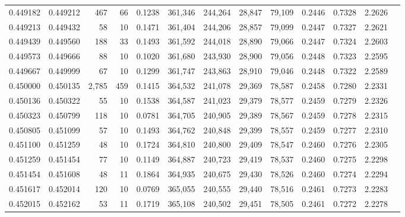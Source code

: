 \begin{tabular}{rrrrrrrrrrrrr}
0.449182 & 0.449212 &   467 &  66 &                                     0.1238 & 361,346 & 244,264 &  28,847 &  79,109 & 0.2446 & 0.7328 & 2.2626 \\
0.449213 & 0.449432 &    58 &  10 &                                     0.1471 & 361,404 & 244,206 &  28,857 &  79,099 & 0.2447 & 0.7327 & 2.2621 \\
0.449439 & 0.449560 &   188 &  33 &                                     0.1493 & 361,592 & 244,018 &  28,890 &  79,066 & 0.2447 & 0.7324 & 2.2603 \\
0.449573 & 0.449666 &    88 &  10 &                                     0.1020 & 361,680 & 243,930 &  28,900 &  79,056 & 0.2448 & 0.7323 & 2.2595 \\
0.449667 & 0.449999 &    67 &  10 &                                     0.1299 & 361,747 & 243,863 &  28,910 &  79,046 & 0.2448 & 0.7322 & 2.2589 \\
0.450000 & 0.450135 & 2,785 & 459 &                                     0.1415 & 364,532 & 241,078 &  29,369 &  78,587 & 0.2458 & 0.7280 & 2.2331 \\
0.450136 & 0.450322 &    55 &  10 &                                     0.1538 & 364,587 & 241,023 &  29,379 &  78,577 & 0.2459 & 0.7279 & 2.2326 \\
0.450323 & 0.450799 &   118 &  10 &                                     0.0781 & 364,705 & 240,905 &  29,389 &  78,567 & 0.2459 & 0.7278 & 2.2315 \\
0.450805 & 0.451099 &    57 &  10 &                                     0.1493 & 364,762 & 240,848 &  29,399 &  78,557 & 0.2459 & 0.7277 & 2.2310 \\
0.451100 & 0.451259 &    48 &  10 &                                     0.1724 & 364,810 & 240,800 &  29,409 &  78,547 & 0.2460 & 0.7276 & 2.2305 \\
0.451259 & 0.451454 &    77 &  10 &                                     0.1149 & 364,887 & 240,723 &  29,419 &  78,537 & 0.2460 & 0.7275 & 2.2298 \\
0.451454 & 0.451608 &    48 &  11 &                                     0.1864 & 364,935 & 240,675 &  29,430 &  78,526 & 0.2460 & 0.7274 & 2.2294 \\
0.451617 & 0.452014 &   120 &  10 &                                     0.0769 & 365,055 & 240,555 &  29,440 &  78,516 & 0.2461 & 0.7273 & 2.2283 \\
0.452015 & 0.452162 &    53 &  11 &                                     0.1719 & 365,108 & 240,502 &  29,451 &  78,505 & 0.2461 & 0.7272 & 2.2278 \\

\end{tabular}
